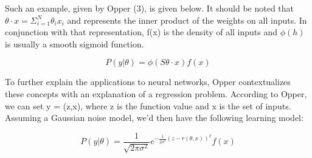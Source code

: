 																																																																																																																																																																																																								     \noindent Such an example, given by Opper (3), is given below. It should be noted that $\theta \cdot x = \Sigma^N_{i=1} \theta_i x_i$ and represents the inner product of the weights on all inputs. In conjunction with that representation, f(x) is the density of all inputs and $\phi(h)$ is usually a smooth sigmoid function.
																																																																																																																																																																																																									     
																																																																																																																																																																																																										     $$P(y | \theta) = \phi(S\theta \cdot x)f(x)$$
																																																																																																																																																																																																											     
																																																																																																																																																																																																												     \noindent To further explain the applications to neural networks, Opper contextualizes these concepts with an explanation of a regression problem. According to Opper, we can set y = (z,x), where z is the function value and x is the set of inputs. Assuming a Gaussian noise model, we'd then have the following learning model:
																																																																																																																																																																																																													     
																																																																																																																																																																																																														     $$P(y | \theta) = \frac{1}{\sqrt{2\pi \sigma^2}}e^{-\frac{1}{2\sigma^2}(z-r(\theta,x))^2}f(x)$$
																																																																																																																																																																																																															     
